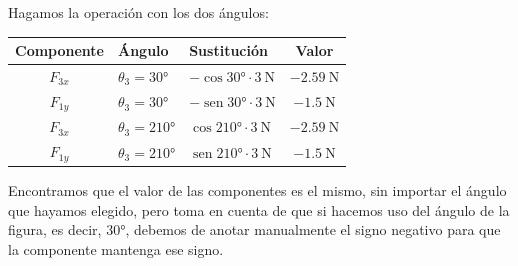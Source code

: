 \documentclass[14pt]{extarticle}
\renewcommand{\sin}{\operatorname{sen}}
\begin{document}
\begin{figure}[H]
\centering
{}
\end{figure}
Hagamos la operación con los dos ángulos:
\begin{table}[H]
\centering
\begin{tabular}{c | l | l | c}
Componente & Ángulo & Sustitución & Valor \\ \hline
$F_{3x}$ & $\theta_{3} = \ang{30}$ & $-\cos \ang{30} \cdot \SI{3}{\newton}$ & $-\SI{2.59}{\newton}$ \\ \hline
$F_{1y}$ & $\theta_{3} = \ang{30}$ & $-\sin \ang{30} \cdot \SI{3}{\newton}$ & $-\SI{1.5}{\newton}$ \\ \hline
$F_{3x}$ & $\theta_{3} = \ang{210}$ & $\cos \ang{210} \cdot \SI{3}{\newton}$ & $-\SI{2.59}{\newton}$ \\ \hline
$F_{1y}$ & $\theta_{3} = \ang{210}$ & $\sin \ang{210} \cdot \SI{3}{\newton}$ & $-\SI{1.5}{\newton}$ \\ \hline
\end{tabular}
\end{table}
Encontramos que el valor de las componentes es el mismo, sin importar el ángulo que hayamos elegido, pero toma en cuenta de que si hacemos uso del ángulo de la figura, es decir, \ang{30}, debemos de anotar manualmente el signo negativo para que la componente mantenga ese signo.
\end{document}
